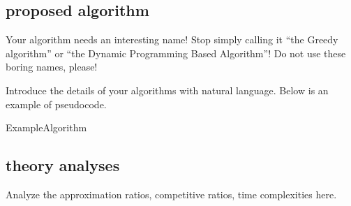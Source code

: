 \subsection{proposed algorithm}

Your algorithm needs an interesting name! Stop simply calling it ``the Greedy algorithm'' or ``the Dynamic Programming Based Algorithm''! Do not use these boring names, please!

Introduce the details of your algorithms with natural language. Below is an example of  pseudocode.


\begin{algorithm}[t]
	\DontPrintSemicolon
	
	
	
		
	

	
	\;
	\caption{ExampleAlgorithm}
	\label{algo:example_algorithm}
\end{algorithm}

\subsection{theory analyses}

Analyze the approximation ratios, competitive ratios, time complexities here.

